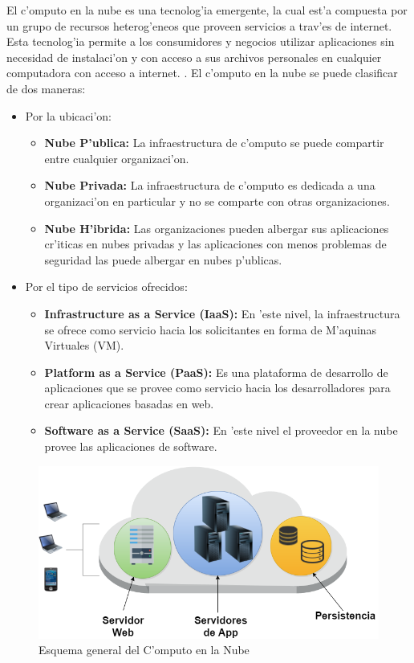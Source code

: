 El c'omputo en la nube es una tecnolog'ia emergente, la cual est'a compuesta por un grupo de recursos heterog'eneos que proveen servicios a trav'es de internet. \cite{agarwal2014efficient} 
Esta tecnolog'ia permite a los consumidores y negocios utilizar aplicaciones sin necesidad de instalaci'on y con acceso a sus archivos personales en cualquier computadora con acceso a internet. \cite{ahmed2012advanced}. 
El c'omputo en la nube se puede clasificar de dos maneras:
\begin{itemize}
\item Por la ubicaci'on: \cite{ahmed2012advanced}  
	\begin{itemize}
	\item \textbf{Nube P'ublica:} La infraestructura de c'omputo se puede compartir entre cualquier organizaci'on.
	\item \textbf{Nube Privada:} La infraestructura de c'omputo es dedicada a una organizaci'on en particular y no se comparte con otras organizaciones.
	\item \textbf{Nube H'ibrida:} Las organizaciones pueden albergar sus aplicaciones cr'iticas en nubes privadas y las aplicaciones con menos problemas de seguridad las puede albergar en nubes p'ublicas.
	\end{itemize}
\item Por el tipo de servicios ofrecidos: \cite{agarwal2014efficient}
	\begin{itemize}
	\item \textbf{Infrastructure as a Service (IaaS):} En 'este nivel, la infraestructura se ofrece como servicio hacia los solicitantes en forma de M'aquinas Virtuales (VM).
	\item \textbf{Platform as a Service (PaaS):} Es una plataforma de desarrollo de aplicaciones que se provee como servicio hacia los desarrolladores para crear aplicaciones basadas en web.
	\item \textbf{Software as a Service (SaaS):} En 'este nivel el proveedor en la nube provee las aplicaciones de software.
	\end{itemize}
\end{itemize}



\begin{figure}
	\caption{Esquema general del C'omputo en la Nube}
	\centering
	\includegraphics[scale=0.5]{media/cloud1}
\end{figure}
